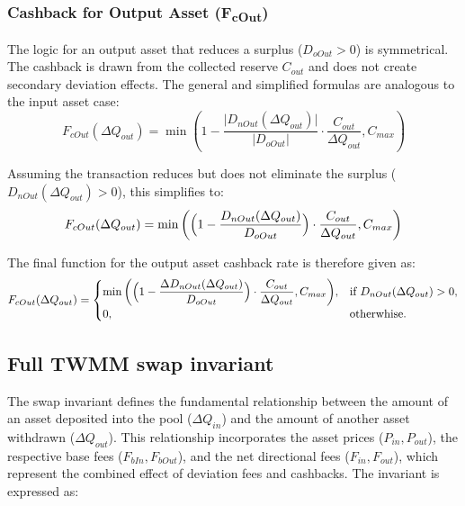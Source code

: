 \subsubsection*{Cashback for Output Asset (F\textsubscript{cOut})}
The logic for an output asset that reduces a surplus ($D_{oOut} > 0$) is symmetrical. The cashback is drawn from the collected reserve $C_{out}$ and does not create secondary deviation effects. The general and simplified formulas are analogous to the input asset case:
\begin{equation}
	\label{eq:invariant_swap_cashback_out_function}
	F_{cOut}(\Delta Q_{out}) = \min\left(1 - \frac{\lvert D_{nOut}(\Delta Q_{out}) \rvert}{ \lvert D_{oOut} \rvert} \cdot \frac{C_{out}}{\Delta Q_{out}}, C_{max}\right)
\end{equation}

Assuming the transaction reduces but does not eliminate the surplus ($D_{nOut}(\Delta Q_{out}) > 0$), this simplifies to:
\begin{equation}
	\label{eq:invariant_swap_cashback_out_function_simplified}
	F_{cOut}(\Delta Q_{out}) = \min\left( \Bigl(1-\frac{ D_{nOut}(\Delta Q_{out})}{ D_{oOut}} \Bigr) \cdot \frac{C_{out}}{\Delta Q_{out}}, C_{max}\right)
\end{equation}

The final function for the output asset cashback rate is therefore given as:
\begin{equation}
	\label{eq:swap_invariant_cashback_out_function_final}
	F_{cOut}(\Delta Q_{out}) = \begin{cases}
		\begin{aligned} \min\left( \Bigl(1- \frac{ \Delta D_{nOut}(\Delta Q_{out})}{ D_{oOut}} \Bigr) \cdot \frac{C_{out}}{\Delta Q_{out}}, C_{max}\right) \end{aligned}, & \text{if } D_{nOut}(\Delta Q_{out}) > 0, \\
		0, & \text{otherwhise.}
	\end{cases}	
\end{equation}

\subsection{Full TWMM swap invariant}
The swap invariant defines the fundamental relationship between the amount of an asset deposited into the pool ($\Delta Q_{in}$) and the amount of another asset withdrawn ($\Delta Q_{out}$). This relationship incorporates the asset prices ($P_{in}, P_{out}$), the respective base fees ($F_{bIn}, F_{bOut}$), and the net directional fees ($F_{in}, F_{out}$), which represent the combined effect of deviation fees and cashbacks. The invariant is expressed as:

